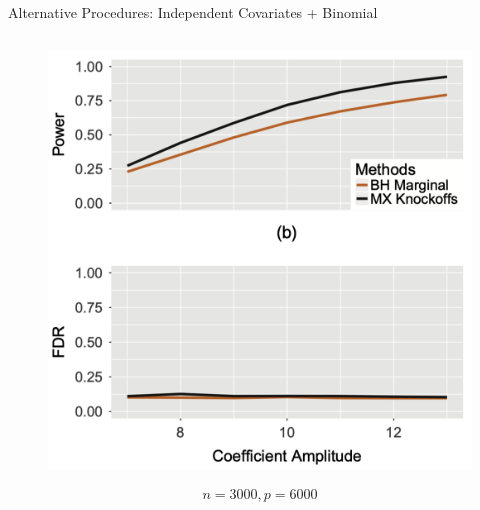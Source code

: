 \begin{frame}{Alternative Procedures: Independent Covariates + Binomial}
{\begin{columns}[T]
        \begin{column}{0.45\textwidth}
            \begin{figure}\label{fig:procedure3_b}
                \centering
                \includegraphics[height = 0.7\textheight]{images/altproced_3_b.png}
            \end{figure}
            \vspace*{-10pt}
            $$ n=3000,p=6000 $$
        \end{column}
    \end{columns}}
\end{frame}

